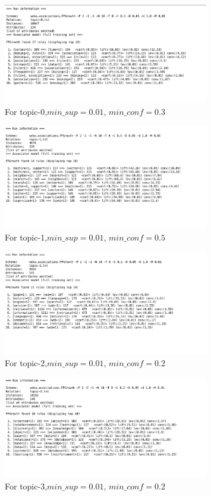 \begin{enumerate}
   \begin{figure}[H]
   \caption{For topic-0,$min\_sup = 0.01$, $min\_conf = 0.3 $}
\includegraphics[width=0.8\textwidth]{Figures/0.png}
\centering
\end{figure}

   \begin{figure}[H]
     \caption{For topic-1,$min\_sup = 0.01$, $min\_conf = 0.5 $}
\includegraphics[width=0.8\textwidth]{Figures/1.png}
\centering
\end{figure}

   \begin{figure}[H]
     \caption{For topic-2,$min\_sup = 0.01$, $min\_conf = 0.2 $}
\includegraphics[width=0.8\textwidth]{Figures/2.png}
\centering
\end{figure}

   \begin{figure}[H]
     \caption{For topic-3,$min\_sup = 0.01$, $min\_conf = 0.2 $}
\includegraphics[width=0.8\textwidth]{Figures/3.png}
\centering
\end{figure}


\end{enumerate}
